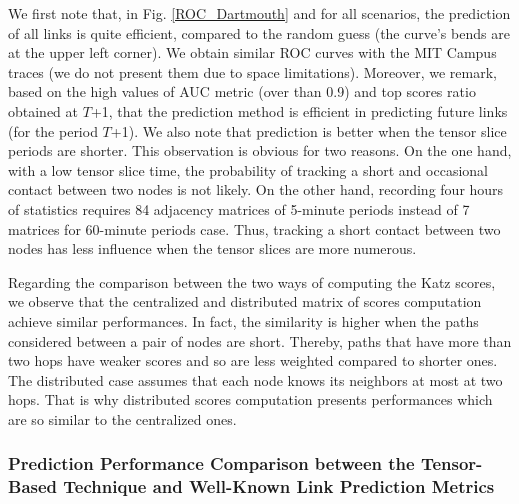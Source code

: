 \documentclass[conference]{IEEEtran}
\begin{document}
\begin{table}[t]
\renewcommand{\arraystretch}{1}
\caption{Table of confusion of a binary prediction technique}
\label{table_confusion} \centering {}
\end{table}

We first note that, in Fig. \ref{ROC_Dartmouth} and for all
scenarios, the prediction of all links is quite efficient, compared
to the random guess (the curve's bends are at the upper left
corner). We obtain similar ROC curves with the MIT Campus traces (we
do not present them due to space limitations). Moreover, we remark,
based on the high values of AUC metric (over than 0.9) and top
scores ratio obtained at $T$+1, that the prediction method is
efficient in predicting future links (for the period $T$+1). We also
note that prediction is better when the tensor slice periods are
shorter. This observation is obvious for two reasons. On the one
hand, with a low tensor slice time, the probability of tracking a
short and occasional contact between two nodes is not likely. On the
other hand, recording four hours of statistics requires 84 adjacency
matrices of 5-minute periods instead of 7 matrices for 60-minute
periods case. Thus, tracking a short contact between two nodes has
less influence when the tensor slices are more numerous.

Regarding the comparison between the two ways of computing the Katz
scores, we observe that the centralized and distributed matrix of
scores computation achieve similar performances. In fact, the
similarity is higher when the paths considered between a pair of
nodes are short. Thereby, paths that have more than two hops have
weaker scores and so are less weighted compared to shorter ones. The
distributed case assumes that each node knows its neighbors at most
at two hops. That is why distributed scores computation presents
performances which are so similar to the centralized ones.

\subsubsection{Prediction Performance Comparison between the
Tensor-Based Technique and Well-Known Link Prediction Metrics}
\end{document}
